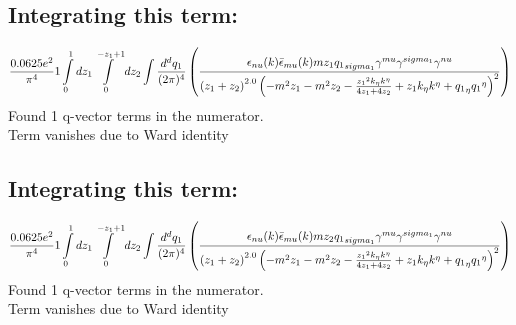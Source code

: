 \subsection*{Integrating this term:}
\begin{dmath}\frac{0.0625 e^{2}}{\pi^{4}}1\int\limits_{ 0 }^{ 1 } d{ z_{ 1 } }\int\limits_{ 0 }^{ - { z_{ 1 } } + 1 } d{ z_{ 2 } }\int\frac{d^d q_1 }{ (2\pi)^4 }\left(\frac{\epsilon_{ \\nu }({ k }) \bar{\epsilon}_{ \\mu }({ k }) m { z_{ 1 } } { { q_1 }_{ \\sigma_1 } } { \gamma^{ \\mu } } { \gamma^{ \\sigma_1 } } { \gamma^{ \\nu } }}{\left({ z_{ 1 } } + { z_{ 2 } }\right)^{2.0} \left(- m^{2} { z_{ 1 } } - m^{2} { z_{ 2 } } - \frac{{ z_{ 1 } }^{2} { { k }_{ \eta } } { { k }^{ \eta } }}{4 { z_{ 1 } } + 4 { z_{ 2 } }} + { z_{ 1 } } { { k }_{ \eta } } { { k }^{ \eta } } + { { q_1 }_{ \eta } } { { q_1 }^{ \eta } }\right)^{2}}\right)\end{dmath}
Found 1 q-vector terms in the numerator.\\
Term vanishes due to Ward identity\\
\subsection*{Integrating this term:}
\begin{dmath}\frac{0.0625 e^{2}}{\pi^{4}}1\int\limits_{ 0 }^{ 1 } d{ z_{ 1 } }\int\limits_{ 0 }^{ - { z_{ 1 } } + 1 } d{ z_{ 2 } }\int\frac{d^d q_1 }{ (2\pi)^4 }\left(\frac{\epsilon_{ \\nu }({ k }) \bar{\epsilon}_{ \\mu }({ k }) m { z_{ 2 } } { { q_1 }_{ \\sigma_1 } } { \gamma^{ \\mu } } { \gamma^{ \\sigma_1 } } { \gamma^{ \\nu } }}{\left({ z_{ 1 } } + { z_{ 2 } }\right)^{2.0} \left(- m^{2} { z_{ 1 } } - m^{2} { z_{ 2 } } - \frac{{ z_{ 1 } }^{2} { { k }_{ \eta } } { { k }^{ \eta } }}{4 { z_{ 1 } } + 4 { z_{ 2 } }} + { z_{ 1 } } { { k }_{ \eta } } { { k }^{ \eta } } + { { q_1 }_{ \eta } } { { q_1 }^{ \eta } }\right)^{2}}\right)\end{dmath}
Found 1 q-vector terms in the numerator.\\
Term vanishes due to Ward identity\\
